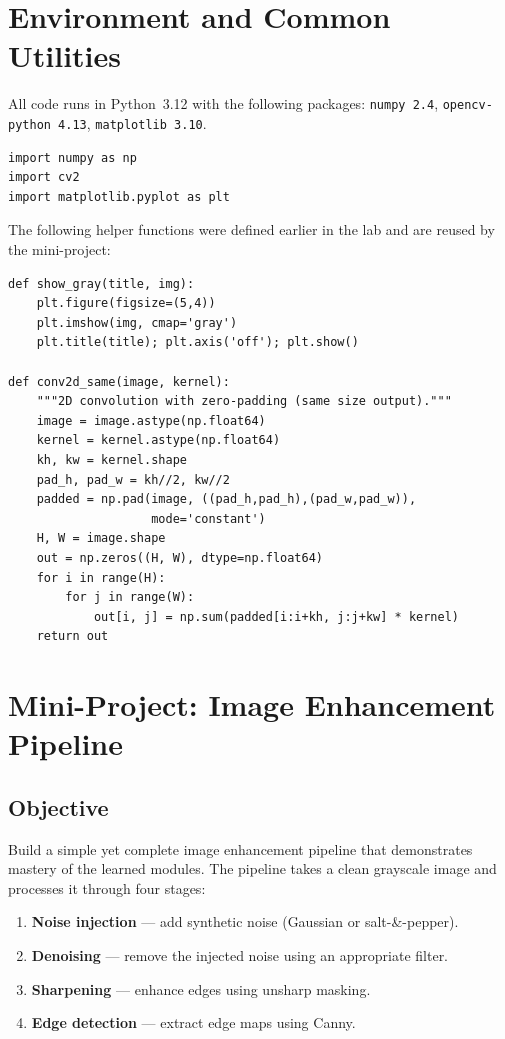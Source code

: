 \documentclass[12pt,a4paper]{article}
\begin{document}
\section{Environment and Common Utilities}

All code runs in Python~3.12 with the following packages:
\texttt{numpy 2.4}, \texttt{opencv-python 4.13}, \texttt{matplotlib 3.10}.

\begin{lstlisting}
import numpy as np
import cv2
import matplotlib.pyplot as plt
\end{lstlisting}

The following helper functions were defined earlier in the lab and are reused by the mini-project:

\begin{lstlisting}
def show_gray(title, img):
    plt.figure(figsize=(5,4))
    plt.imshow(img, cmap='gray')
    plt.title(title); plt.axis('off'); plt.show()

def conv2d_same(image, kernel):
    """2D convolution with zero-padding (same size output)."""
    image = image.astype(np.float64)
    kernel = kernel.astype(np.float64)
    kh, kw = kernel.shape
    pad_h, pad_w = kh//2, kw//2
    padded = np.pad(image, ((pad_h,pad_h),(pad_w,pad_w)),
                    mode='constant')
    H, W = image.shape
    out = np.zeros((H, W), dtype=np.float64)
    for i in range(H):
        for j in range(W):
            out[i, j] = np.sum(padded[i:i+kh, j:j+kw] * kernel)
    return out
\end{lstlisting}

\section{Mini-Project: Image Enhancement Pipeline}

\subsection{Objective}

Build a simple yet complete image enhancement pipeline that demonstrates mastery of the learned modules. The pipeline takes a clean grayscale image and processes it through four stages:

\begin{enumerate}
  \item \textbf{Noise injection} --- add synthetic noise (Gaussian or salt-\&-pepper).
  \item \textbf{Denoising} --- remove the injected noise using an appropriate filter.
  \item \textbf{Sharpening} --- enhance edges using unsharp masking.
  \item \textbf{Edge detection} --- extract edge maps using Canny.
\end{enumerate}
\end{document}
